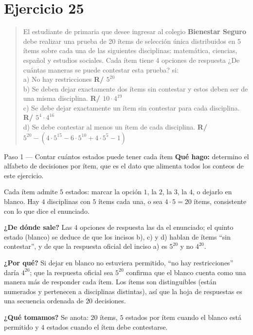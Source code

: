 \documentclass[11pt]{article}
\begin{document}
\section*{Ejercicio 25}

\begin{quote}
El estudiante de primaria que desee ingresar al colegio \textbf{Bienestar Seguro} debe realizar una prueba de 20 ítems de selección única distribuidos en 5 ítems sobre cada una de las siguientes disciplinas: matemática, ciencias, español y estudios sociales. Cada ítem tiene 4 opciones de respuesta ¿De cuántas maneras se puede contestar esta prueba? si:\\[2pt]
a) No hay restricciones \quad \textbf{R/ $5^{20}$}\\
b) Se deben dejar exactamente dos ítems sin contestar y estos deben ser de una misma disciplina. \quad \textbf{R/ $10\cdot 4^{19}$}\\
c) Se debe dejar exactamente un ítem sin contestar para cada disciplina. \quad \textbf{R/ $5^4\cdot 4^{16}$}\\
d) Se debe contestar al menos un ítem de cada disciplina. \quad \textbf{R/ $5^{20}-(4\cdot 5^{15}-6\cdot 5^{10}+4\cdot 5^{5}-1)$}
\end{quote}

\begin{paso}{Paso 1 --- Contar cuántos estados puede tener cada ítem}
\textbf{Qué hago:} determino el alfabeto de decisiones por ítem, que es el dato que alimenta todos los conteos de este ejercicio.

Cada ítem admite $5$ estados: marcar la opción $1$, la $2$, la $3$, la $4$, o dejarlo en blanco. Hay $4$ disciplinas con $5$ ítems cada una, o sea $4\cdot 5=20$ ítems, consistente con lo que dice el enunciado.

\textbf{¿De dónde sale?} Las $4$ opciones de respuesta las da el enunciado; el quinto estado (blanco) se deduce de que los incisos b), c) y d) hablan de ítems ``sin contestar'', y de que la respuesta oficial del inciso a) es $5^{20}$ y no $4^{20}$.

\textbf{¿Por qué?} Si dejar en blanco no estuviera permitido, ``no hay restricciones'' daría $4^{20}$; que la respuesta oficial sea $5^{20}$ confirma que el blanco cuenta como una manera más de responder cada ítem. Los ítems son distinguibles (están numerados y pertenecen a disciplinas distintas), así que la hoja de respuestas es una secuencia ordenada de $20$ decisiones.

\textbf{¿Qué tomamos?} Se anota: $20$ ítems, $5$ estados por ítem cuando el blanco está permitido y $4$ estados cuando el ítem debe contestarse.
\end{paso}
\end{document}
